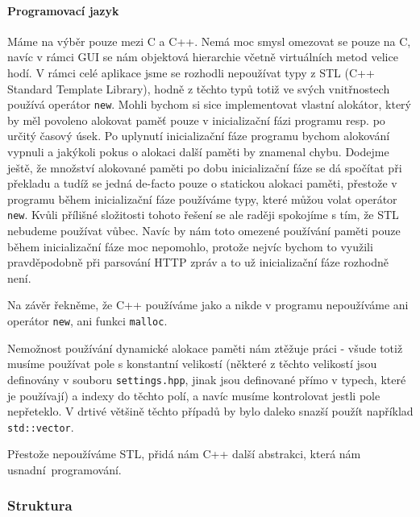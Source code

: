 \paragraph{Programovací jazyk}
Máme na výběr pouze mezi C a C++.
Nemá moc smysl omezovat se pouze na C, navíc v rámci GUI se nám objektová hierarchie včetně
virtuálních metod velice hodí.
V rámci celé aplikace jsme se rozhodli nepoužívat typy z STL (C++ Standard Template Library), hodně z
těchto typů totiž ve svých vnitřnostech používá operátor \texttt{new}.
Mohli bychom si sice implementovat vlastní alokátor, který by měl povoleno alokovat paměť pouze
v inicializační fázi programu resp. po určitý časový úsek.
Po uplynutí inicializační fáze programu bychom alokování vypnuli a jakýkoli pokus o alokaci další
paměti by znamenal chybu.
Dodejme ještě, že množství alokované paměti po dobu inicializační fáze se dá spočítat při překladu
a tudíž se jedná de-facto pouze o statickou alokaci paměti, přestože v programu během inicializační
fáze používáme typy, které můžou volat operátor \texttt{new}.
Kvůli přílišné složitosti tohoto řešení se ale raději spokojíme s tím, že STL nebudeme používat vůbec.
Navíc by nám toto omezené používání  paměti pouze během inicializační fáze
moc nepomohlo, protože nejvíc bychom to využili pravděpodobně při parsování HTTP zpráv a to už
inicializační fáze rozhodně není.

Na závěr řekněme, že C++ používáme jako  a nikde v programu nepoužíváme ani operátor
\texttt{new}, ani funkci \texttt{malloc}.

Nemožnost používání dynamické alokace paměti nám ztěžuje práci - všude totiž musíme používat pole s
konstantní velikostí (některé z těchto velikostí jsou definovány v souboru \texttt{settings.hpp}, jinak
jsou definované přímo v typech, které je používají) a indexy do těchto polí, a navíc musíme kontrolovat
jestli pole nepřeteklo.
V drtivé většině těchto případů by bylo daleko snazší použít například \texttt{std::vector}.

Přestože nepoužíváme STL, přidá nám C++ další abstrakci, která nám usnadní~programování.

\subsubsection{Struktura}

